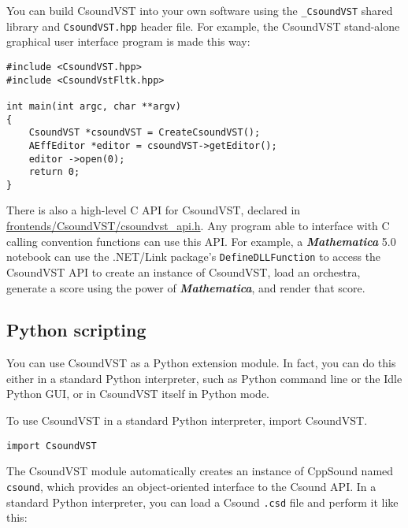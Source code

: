 \documentclass[10pt,letterpaper,onecolumn]{book}
\begin{document}
You can build CsoundVST into your own software using the \texttt{\_CsoundVST} shared library and \texttt{CsoundVST.hpp} header file. For example, the CsoundVST stand-alone graphical user interface program is made this way:

\begin{lstlisting}
#include <CsoundVST.hpp>
#include <CsoundVstFltk.hpp>

int main(int argc, char **argv)
{
    CsoundVST *csoundVST = CreateCsoundVST();
    AEffEditor *editor = csoundVST->getEditor();
    editor ->open(0);
    return 0;
}
\end{lstlisting}

There is also a high-level C API for CsoundVST, declared in \url{frontends/CsoundVST/csoundvst\_api.h}. Any program able to interface with C calling convention functions can use this API. For example, a \textbf{\emph{Mathematica}} 5.0 notebook can use the .NET/Link package's \texttt{DefineDLLFunction} to access the CsoundVST API to create an instance of CsoundVST, load an orchestra, generate a score using the power of \textbf{\emph{Mathematica}}, and render that score.

\subsection{Python scripting}

You can use CsoundVST as a Python extension module. In fact, you can do this either in a standard Python interpreter, such as Python command line or the Idle Python GUI, or in CsoundVST itself in Python mode.

To use CsoundVST in a standard Python interpreter, import CsoundVST.

\begin{lstlisting}
import CsoundVST
\end{lstlisting}

The CsoundVST module automatically creates an instance of CppSound named \texttt{csound}, which provides an object-oriented interface to the Csound API. In a standard Python interpreter, you can load a Csound \texttt{.csd} file and perform it like this: 
\end{document}

